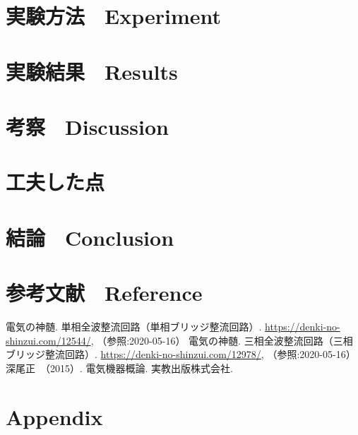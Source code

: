 \section{実験方法　Experiment}

\section{実験結果　Results}

\section{考察　Discussion}

\section{工夫した点}

\section{結論　Conclusion}

\section{参考文献　Reference}
\begin{thebibliography}{9}
     電気の神髄. 単相全波整流回路（単相ブリッジ整流回路）. \url{https://denki-no-shinzui.com/12544/}, （参照:2020-05-16）
     電気の神髄. 三相全波整流回路（三相ブリッジ整流回路）. \url{https://denki-no-shinzui.com/12978/}, （参照:2020-05-16）
     深尾正　（2015）. 電気機器概論. 実教出版株式会社.
\end{thebibliography}


\appendix
\section{Appendix}


